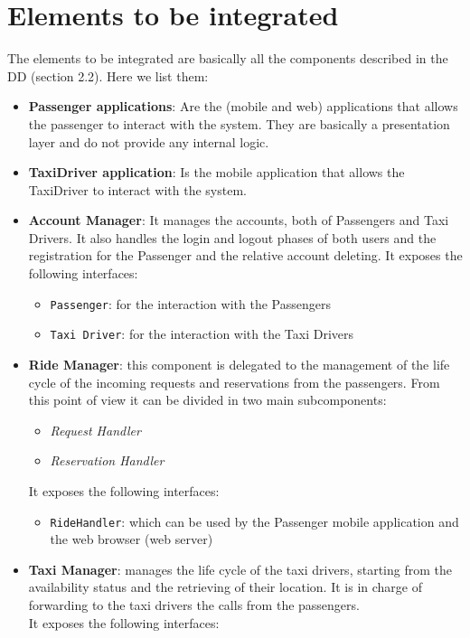 \section{Elements to be integrated}
The elements to be integrated are basically all the components described in the DD (section 2.2). Here we list them:
\begin{itemize}
	\item \textbf{Passenger applications}\label{comp:PassengerApplications}: Are the (mobile and web) applications that allows the passenger to interact with the system. They are basically a presentation layer and do not provide any internal logic.
	\item \textbf{TaxiDriver application}\label{comp:TaxiDriverApplications}: Is the mobile application that allows the TaxiDriver to interact with the system.
	\item \textbf{Account Manager}\label{comp:AccountManager}: It manages the accounts, both of Passengers and Taxi Drivers. It also handles the login and logout phases of both users and the registration for the Passenger and the relative account deleting. It exposes the following interfaces:
	\begin{itemize}
		\item \texttt{Passenger}: for the interaction with the Passengers
		\item \texttt{Taxi Driver}: for the interaction with the Taxi Drivers
	\end{itemize}
	\item \textbf{Ride Manager}\label{comp:RideManager}: this component is delegated to the management of the life cycle of the incoming requests and reservations from the passengers. From this point of view it can be divided in two main subcomponents:
	\begin{itemize}
		\item \textit{Request Handler}
		\item \textit{Reservation Handler}
	\end{itemize}
	It exposes the following interfaces:
	\begin{itemize}
		\item \texttt{RideHandler}: which can be used by the Passenger mobile application and the web browser (web server)
	\end{itemize}
	\item \textbf{Taxi Manager}\label{comp:TaxiManager}: manages the life cycle of the taxi drivers, starting from the availability status and the retrieving of their location. It is in charge of forwarding to the taxi drivers the calls from the passengers.\\ It exposes the following interfaces:

\end{itemize}
